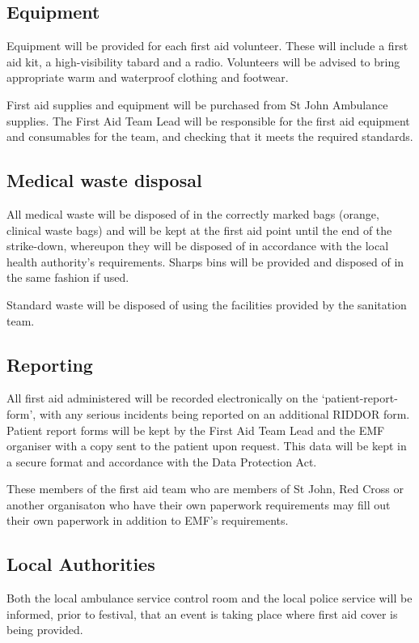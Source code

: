 \subsection{Equipment}
Equipment will be provided for each first aid volunteer. These will include a
first aid kit, a high-visibility tabard and a radio. Volunteers will be advised
to bring appropriate warm and waterproof clothing and footwear.

First aid supplies and equipment will be purchased from St John Ambulance
supplies. The First Aid Team Lead will be responsible for the first aid
equipment and consumables for the team, and checking that it meets the required
standards.

\subsection{Medical waste disposal}
All medical waste will be disposed of in the correctly marked bags (orange,
clinical waste bags) and will be kept at the first aid point until the end of
the strike-down, whereupon they will be disposed of in accordance with the
local health authority's requirements. Sharps bins will be provided and
disposed of in the same fashion if used.

Standard waste will be disposed of using the facilities provided by the sanitation team.

\subsection{Reporting}
All first aid administered will be recorded electronically on the
‘patient-report-form', with any serious incidents being reported on an
additional RIDDOR form. Patient report forms will be kept by the First Aid Team
Lead and the EMF organiser with a copy sent to the patient upon request. This
data will be kept in a secure format and accordance with the Data Protection
Act.

These members of the first aid team who are members of St John, Red Cross or another
organisaton who have their own paperwork requirements may fill out their own paperwork
in addition to EMF's requirements.

\subsection{Local Authorities}
Both the local ambulance service control room and the local police service will
be informed, prior to festival, that an event is taking place where first aid
cover is being provided.

